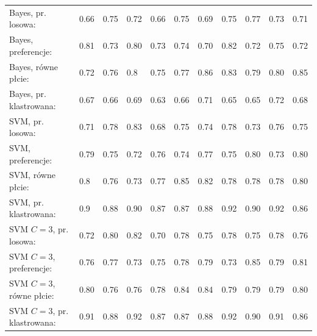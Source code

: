 \documentclass[12pt,a4paper,oneside]{report} %
\begin{document}
\begin{table}
\begin{tabular}{l|l|l|l|l|l|l|l|l|l|l}
\hline
{\small Bayes, pr. losowa:                     } & {\small 0.66 } & {\small 0.75 } & {\small 0.72 } & {\small 0.66 } & {\small 0.75 } & {\small 0.69 } & {\small 0.75 } & {\small 0.77 } & {\small 0.73 } & {\small 0.71 } \\ 
{\small Bayes, preferencje: } & {\small 0.81 } & {\small 0.73 } & {\small 0.80 } & {\small 0.73 } & {\small 0.74 } & {\small 0.70 } & {\small 0.82 } & {\small 0.72 } & {\small 0.75 } & 0.72 \\
{\small Bayes, równe płcie:        } & {\small 0.72 } & {\small 0.76 } & {\small 0.8 } & {\small 0.75 } & {\small 0.77 } & {\small 0.86 } & {\small 0.83 } & {\small 0.79 } & {\small 0.80 } & {\small 0.85 } \\ 
{\small Bayes, pr. klastrowana:                } & {\small 0.67 } & {\small 0.66 } & {\small 0.69 } & {\small 0.63 } & {\small 0.66 } & {\small 0.71 } & {\small 0.65 } & {\small 0.65 } & {\small 0.72 } & 0.68 \\
{\small SVM, pr. losowa:                              } & {\small 0.71 } & {\small 0.78 } & {\small 0.83 } & {\small 0.68 } & {\small 0.75 } & {\small 0.74 } & {\small 0.78 } & {\small 0.73 } & {\small 0.76 } & 0.75 \\
{\small SVM, preferencje:          } & {\small 0.79 } & {\small 0.75 } & {\small 0.72 } & {\small 0.76 } & {\small 0.74 } & {\small 0.77 } & {\small 0.75 } & {\small 0.80 } & {\small 0.73 } & 0.80 \\
{\small SVM, równe płcie:                 } & {\small 0.8 } & {\small 0.76 } & {\small 0.73 } & {\small 0.77 } & {\small 0.85 } & {\small 0.82 } & {\small 0.78 } & {\small 0.78 } & {\small 0.78 } & 0.80 \\
{\small SVM, pr. klastrowana:                         } & {\small 0.9 } & {\small 0.88 } & {\small 0.90 } & {\small 0.87 } & {\small 0.87 } & {\small 0.88 } & {\small 0.92 } & {\small 0.90 } & {\small 0.92 } & {\small 0.86 } \\ 
{\small SVM $C=3$, pr. losowa: } & {\small 0.72 } & {\small 0.80 } & {\small 0.82 } & {\small 0.70 } & {\small 0.78 } & {\small 0.75 } & {\small 0.78 } & {\small 0.75 } & {\small 0.78 } & {\small 0.76 } \\ 
{\small SVM $C=3$, preferencje: } & {\small 0.76 } & {\small 0.77 } & {\small 0.73 } & {\small 0.75 } & {\small 0.78 } & {\small 0.79 } & {\small 0.73 } & {\small 0.85 } & {\small 0.79 } & {\small 0.81 } \\ 
{\small SVM $C=3$, równe płcie: } & {\small 0.80 } & {\small 0.76 } & {\small 0.76 } & {\small 0.78 } & {\small 0.84 } & {\small 0.84 } & {\small 0.79 } & {\small 0.79 } & {\small 0.79 } & {\small 0.80 } \\ 
{\small SVM $C=3$, pr. klastrowana: } & {\small 0.91 } & {\small 0.88 } & {\small 0.92 } & {\small 0.87 } & {\small 0.87 } & {\small 0.88 } & {\small 0.92 } & {\small 0.90 } & {\small 0.91 } & {\small 0.86 } \\ 



\end{tabular}
\end{table}
\end{document}
